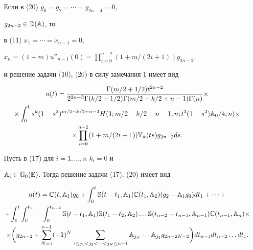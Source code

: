 \begin{exam} Если в (20) $g_0=g_2=\dotsb=g_{2n-4}=0$, 


$g_{2n-2}\in\Bbb D(\Bbb A)$, то 


в (11) $x_1=\dotsb=x_{n-1}=0$, 


$x_n=(1+m)u''_{n-1}(0)=\prod\limits^{n-2}_{i=0}(1+m/(2i+1))g_{2n-2}$, 


и решение задачи (10), (20) в силу замечания 1 имеет вид 


\begin{multline*} 


u(t)= 


\frac{\Gamma(m/2+1/2)t^{2n-2}} 


{2^{2n-3}\Gamma(k/2+1/2)\Gamma(m/2-k/2+n-1)\Gamma(n)}\times \\ 


% 


\times\int^1_0 s^k(1-s^2)^{m/2-k/2+n-2} 


H(1;m/2-k/2+n-1,n;t^2(1-s^2)\Bbb A_0/4;n) \times \\


%


\times \prod^{n-2}_{i=0}(1+m/(2i+1))\Bbb Y_k(ts)g_{2n-2}ds. 


\end{multline*} 


\end{exam} 


 


\begin{exam} Пусть в (17) для $i=1,\dotsc,n$\; $k_i=0$ и 


$\Bbb A_i\in\Bbb G_0(\Bbb E)$. Тогда решение задачи (17), (20) имеет вид 


\begin{multline} 


u(t)=\Bbb C(t,\Bbb A_1)g_0+\int^t_0\Bbb S(t-t_1,\Bbb A_1) 


\Bbb C(t_1,\Bbb A_2)(g_2-\Bbb A_1g_0)dt_1+\dotsb+ \\ 


% 


+\int^t_0\int^{t_1}_0\dotsb\int^{t_{n-2}}_0 


\Bbb S(t-t_1,\Bbb A_1)\Bbb S(t_1-t_2,\Bbb A_2)\dotsc 


\Bbb S(t_{n-2}-t_{n-1},\Bbb A_{n-1})\Bbb C(t_{n-1},\Bbb A_n)\times \\ 


% 


\times\bigg(g_{2n-2}+\sum^{n-1}_{N=1}(-1)^N 


\sum_{1\le j_1<j_2<\dotsb<j_N\le n-1}\Bbb A_{j_N}\dotsb


\Bbb A_{j_1}g_{2n-2N-2}\bigg)dt_{n-1}dt_{n-2}\dotsc dt_1. 


\end{multline} 


\end{exam} 



